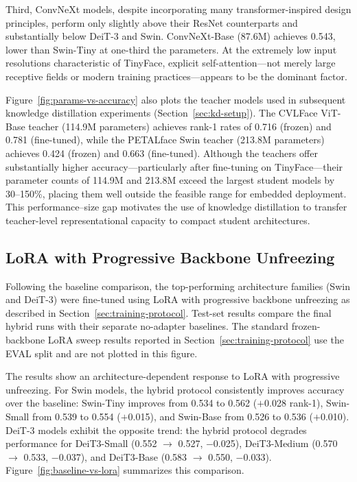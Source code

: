 \documentclass[runningheads,a4paper]{llncs}
\begin{document}
Third, ConvNeXt models, despite incorporating many transformer-inspired design principles, perform only slightly above their ResNet counterparts and substantially below DeiT-3 and Swin. ConvNeXt-Base (87.6M) achieves 0.543, lower than Swin-Tiny at one-third the parameters. At the extremely low input resolutions characteristic of TinyFace, explicit self-attention---not merely large receptive fields or modern training practices---appears to be the dominant factor.

Figure~\ref{fig:params-vs-accuracy} also plots the teacher models used in subsequent knowledge distillation experiments (Section~\ref{sec:kd-setup}). The CVLFace ViT-Base teacher (114.9M parameters) achieves rank-1 rates of 0.716 (frozen) and 0.781 (fine-tuned), while the PETALface Swin teacher (213.8M parameters) achieves 0.424 (frozen) and 0.663 (fine-tuned). Although the teachers offer substantially higher accuracy---particularly after fine-tuning on TinyFace---their parameter counts of 114.9M and 213.8M exceed the largest student models by 30--150\%, placing them well outside the feasible range for embedded deployment. This performance--size gap motivates the use of knowledge distillation to transfer teacher-level representational capacity to compact student architectures.

\subsection{LoRA with Progressive Backbone Unfreezing}
Following the baseline comparison, the top-performing architecture families (Swin and DeiT-3) were fine-tuned using LoRA with progressive backbone unfreezing as described in Section~\ref{sec:training-protocol}. Test-set results compare the final hybrid runs with their separate no-adapter baselines. The standard frozen-backbone LoRA sweep results reported in Section~\ref{sec:training-protocol} use the EVAL split and are not plotted in this figure.

The results show an architecture-dependent response to LoRA with progressive unfreezing. For Swin models, the hybrid protocol consistently improves accuracy over the baseline: Swin-Tiny improves from 0.534 to 0.562 ($+$0.028 rank-1), Swin-Small from 0.539 to 0.554 ($+$0.015), and Swin-Base from 0.526 to 0.536 ($+$0.010). DeiT-3 models exhibit the opposite trend: the hybrid protocol degrades performance for DeiT3-Small (0.552 $\rightarrow$ 0.527, $-$0.025), DeiT3-Medium (0.570 $\rightarrow$ 0.533, $-$0.037), and DeiT3-Base (0.583 $\rightarrow$ 0.550, $-$0.033). Figure~\ref{fig:baseline-vs-lora} summarizes this comparison.
\end{document}
